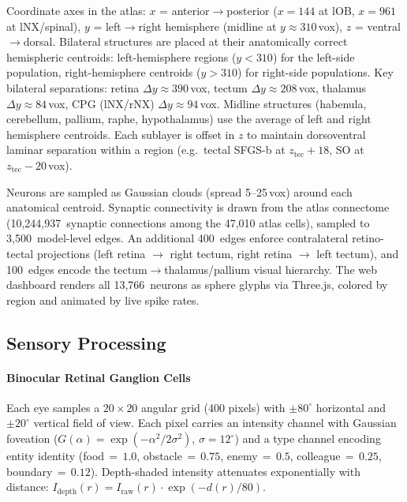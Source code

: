\documentclass[12pt]{article}
\begin{document}
Coordinate axes in the atlas: $x$ = anterior$\to$posterior ($x=144$ at lOB,
$x=961$ at lNX/spinal), $y$ = left$\to$right hemisphere (midline at $y\approx310$\,vox),
$z$ = ventral$\to$dorsal.
Bilateral structures are placed at their anatomically correct hemispheric
centroids: left-hemisphere regions ($y < 310$) for the left-side population,
right-hemisphere centroids ($y > 310$) for right-side populations.
Key bilateral separations: retina $\Delta y \approx 390$\,vox, tectum
$\Delta y \approx 208$\,vox, thalamus $\Delta y \approx 84$\,vox, CPG (lNX/rNX)
$\Delta y \approx 94$\,vox.
Midline structures (habenula, cerebellum, pallium, raphe, hypothalamus) use
the average of left and right hemisphere centroids.
Each sublayer is offset in $z$ to maintain dorsoventral laminar separation
within a region (e.g.\ tectal SFGS-b at $z_\text{tec}+18$, SO at $z_\text{tec}-20$\,vox).

Neurons are sampled as Gaussian clouds (spread 5--25\,vox) around each
anatomical centroid.
Synaptic connectivity is drawn from the atlas connectome
(10,244,937~synaptic connections among the 47,010 atlas cells), sampled to
3,500~model-level edges.
An additional 400~edges enforce contralateral retino-tectal projections
(left retina $\to$ right tectum, right retina $\to$ left tectum),
and 100~edges encode the tectum$\to$thalamus/pallium visual hierarchy.
The web dashboard renders all 13,766~neurons as sphere glyphs via Three.js,
colored by region and animated by live spike rates.

\subsection{Sensory Processing}\label{sec:sensory}

\paragraph{Binocular Retinal Ganglion Cells}

Each eye samples a $20 \times 20$ angular grid (400 pixels) with
$\pm 80^\circ$ horizontal and $\pm 20^\circ$ vertical field of view.
Each pixel carries an intensity channel with Gaussian foveation
($G(\alpha) = \exp(-\alpha^2 / 2\sigma^2)$, $\sigma = 12^\circ$)
and a type channel encoding entity identity (food$\,{=}\,1.0$,
obstacle$\,{=}\,0.75$, enemy$\,{=}\,0.5$, colleague$\,{=}\,0.25$,
boundary$\,{=}\,0.12$).
Depth-shaded intensity attenuates exponentially with distance:
$I_\text{depth}(r) = I_\text{raw}(r) \cdot \exp(-d(r)/80)$.
\end{document}
